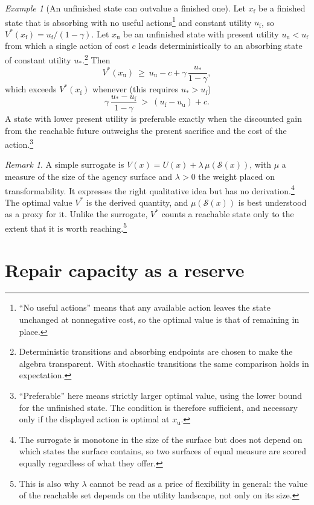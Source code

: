\documentclass[11pt]{article}
\theoremstyle{remark}
\newtheorem{remark}{Remark}
\newtheorem{example}{Example}
\begin{document}
\begin{example}[An unfinished state can outvalue a finished one]
Let $x_{\mathrm f}$ be a finished state that is absorbing with no useful actions\footnote{``No useful actions'' means that any available action leaves the state unchanged at nonnegative cost, so the optimal value is that of remaining in place.} and constant utility $u_{\mathrm f}$, so $V^\ast(x_{\mathrm f})=u_{\mathrm f}/(1-\gamma)$. Let $x_{\mathrm u}$ be an unfinished state with present utility $u_{\mathrm u}<u_{\mathrm f}$ from which a single action of cost $c$ leads deterministically to an absorbing state of constant utility $u_\ast$.\footnote{Deterministic transitions and absorbing endpoints are chosen to make the algebra transparent. With stochastic transitions the same comparison holds in expectation.} Then
\[
V^\ast(x_{\mathrm u})\ \ge\ u_{\mathrm u}-c+\gamma\,\frac{u_\ast}{1-\gamma},
\]
which exceeds $V^\ast(x_{\mathrm f})$ whenever (this requires $u_\ast>u_{\mathrm f}$)
\[
\gamma\,\frac{u_\ast-u_{\mathrm f}}{1-\gamma}\ >\ (u_{\mathrm f}-u_{\mathrm u})+c .
\]
A state with lower present utility is preferable exactly when the discounted gain from the reachable future outweighs the present sacrifice and the cost of the action.\footnote{``Preferable'' here means strictly larger optimal value, using the lower bound for the unfinished state. The condition is therefore sufficient, and necessary only if the displayed action is optimal at $x_{\mathrm u}$.}
\end{example}

\begin{remark}
A simple surrogate is $V(x)=U(x)+\lambda\,\mu(\mathcal S(x))$, with $\mu$ a measure of the size of the agency surface and $\lambda>0$ the weight placed on transformability. It expresses the right qualitative idea but has no derivation.\footnote{The surrogate is monotone in the size of the surface but does not depend on which states the surface contains, so two surfaces of equal measure are scored equally regardless of what they offer.} The optimal value $V^\ast$ is the derived quantity, and $\mu(\mathcal S(x))$ is best understood as a proxy for it. Unlike the surrogate, $V^\ast$ counts a reachable state only to the extent that it is worth reaching.\footnote{This is also why $\lambda$ cannot be read as a price of flexibility in general: the value of the reachable set depends on the utility landscape, not only on its size.}
\end{remark}


\section{Repair capacity as a reserve}
\end{document}
